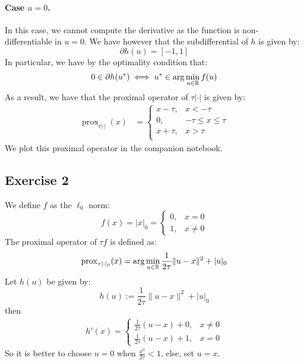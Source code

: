 \documentclass[12pt]{article}
\newcommand{\prox}{\operatorname{prox}}
\begin{document}
\paragraph{Case $u = 0$.}
In this case, we cannot compute the derivative as the function is non-differentiable in $u = 0$. We have however that the subdifferential of $h$ is given by:
$$
  \partial h(u) = [-1, 1]
$$
In particular, we have by the optimality condition that:
\begin{equation}
  0 \in \partial h(u^*) \iff u^* \in \arg \min_{u \in \mathbb{R}} f(u)
\end{equation}
As a result, we have that the proximal operator of $\tau |\cdot|$ is given by:
\begin{align*}
  \prox_{\tau |\cdot|}(x)
   & = \begin{cases}
    x - \tau, & x < -\tau              \\
    0,        & -\tau \leq x \leq \tau \\
    x + \tau, & x > \tau               \\
  \end{cases}
\end{align*}
We plot this proximal operator in the companion notebook.

\subsection{Exercise 2}
We define $f$ as the $\ell_0$ norm:
\begin{equation}
  f(x) = |x|_0 = \begin{cases}
    0, & x = 0    \\
    1, & x \neq 0
  \end{cases}
\end{equation}
The proximal operator of $\tau f$ is defined as:
\begin{equation}
  \prox_{\tau |\cdot|_0}(x) = \arg\min_{u \in \R} \frac{1}{2\tau}\|u-x\|^2 + |u|_0
\end{equation}
Let $h(u)$ be given by:
$$
h(u) := \frac{1}{2\tau}\|u-x\|^2 + |u|_0
$$
then 
\begin{align*}
  h'(x) = \begin{cases}
    \frac{1}{2\tau} (u-x) + 0, & x \neq 0 \\
    \frac{1}{2\tau} (u-x) + 1, & x = 0
  \end{cases}
\end{align*}
So it is better to choose $u = 0$ when $\frac{x^2}{2\tau} < 1$, else, set $u = x$.
\end{document}
